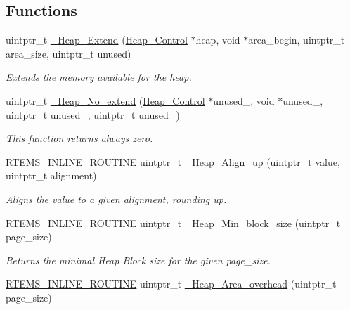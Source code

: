 \subsection*{Functions}
\begin{DoxyCompactItemize}
\item 
uintptr\+\_\+t \mbox{\hyperlink{group__RTEMSScoreHeap_ga7484f40d81ae26a7f5b3773a2dd006be}{\+\_\+\+Heap\+\_\+\+Extend}} (\mbox{\hyperlink{structHeap__Control}{Heap\+\_\+\+Control}} $\ast$heap, void $\ast$area\+\_\+begin, uintptr\+\_\+t area\+\_\+size, uintptr\+\_\+t unused)
\begin{DoxyCompactList}\small\item\em Extends the memory available for the heap. \end{DoxyCompactList}\item 
uintptr\+\_\+t \mbox{\hyperlink{group__RTEMSScoreHeap_ga34c79fc0ef24f7bff393aedccff17a29}{\+\_\+\+Heap\+\_\+\+No\+\_\+extend}} (\mbox{\hyperlink{structHeap__Control}{Heap\+\_\+\+Control}} $\ast$unused\+\_, void $\ast$unused\+\_, uintptr\+\_\+t unused\+\_, uintptr\+\_\+t unused\+\_)
\begin{DoxyCompactList}\small\item\em This function returns always zero. \end{DoxyCompactList}\item 
\mbox{\hyperlink{group__RTEMSScoreBaseDefs_gac216239df231d5dbd15e3520b0b9313f}{R\+T\+E\+M\+S\+\_\+\+I\+N\+L\+I\+N\+E\+\_\+\+R\+O\+U\+T\+I\+NE}} uintptr\+\_\+t \mbox{\hyperlink{group__RTEMSScoreHeap_gaa7c54b3d49cb3fbcf12bbf7a7a45e8d5}{\+\_\+\+Heap\+\_\+\+Align\+\_\+up}} (uintptr\+\_\+t value, uintptr\+\_\+t alignment)
\begin{DoxyCompactList}\small\item\em Aligns the value to a given alignment, rounding up. \end{DoxyCompactList}\item 
\mbox{\hyperlink{group__RTEMSScoreBaseDefs_gac216239df231d5dbd15e3520b0b9313f}{R\+T\+E\+M\+S\+\_\+\+I\+N\+L\+I\+N\+E\+\_\+\+R\+O\+U\+T\+I\+NE}} uintptr\+\_\+t \mbox{\hyperlink{group__RTEMSScoreHeap_ga54ed70e7cf8e99037c356772c927eaee}{\+\_\+\+Heap\+\_\+\+Min\+\_\+block\+\_\+size}} (uintptr\+\_\+t page\+\_\+size)
\begin{DoxyCompactList}\small\item\em Returns the minimal Heap Block size for the given page\+\_\+size. \end{DoxyCompactList}\item 
\mbox{\hyperlink{group__RTEMSScoreBaseDefs_gac216239df231d5dbd15e3520b0b9313f}{R\+T\+E\+M\+S\+\_\+\+I\+N\+L\+I\+N\+E\+\_\+\+R\+O\+U\+T\+I\+NE}} uintptr\+\_\+t \mbox{\hyperlink{group__RTEMSScoreHeap_gaa4fd1c467f6288c7c7501e99b8446e27}{\+\_\+\+Heap\+\_\+\+Area\+\_\+overhead}} (uintptr\+\_\+t page\+\_\+size)

\end{DoxyCompactItemize}
